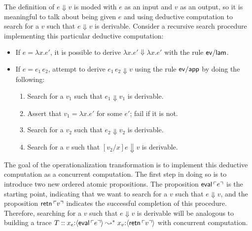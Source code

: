 The definition of $e \Downarrow v$ is moded with $e$ as an input and
$v$ as an output, so it is meaningful to talk about being given $e$
and using deductive computation to search for a $v$ such that $e
\Downarrow v$ is derivable.  Consider a recursive search procedure
implementing this particular deductive computation:
\begin{itemize}
\item
      If $e = \lambda x. e'$, 
      it is possible to derive 
      $\lambda x. e' \Downarrow \lambda x. e'$
      with the rule ${\sf ev/lam}$.
\item
       If $e = e_1\,e_2$,
       attempt to derive 
       $e_1\,e_2 \Downarrow v$
       using the rule ${\sf ev/app}$ by doing the following:
    \begin{enumerate}
    \item Search for a $v_1$ such that 
          $e_1 \Downarrow v_1$ is derivable.
    \item Assert that $v_1 = \lambda x.e'$ for some
          $e'$; fail if it is not.
    \item Search for a $v_2$ such that 
          $e_2 \Downarrow v_2$ is derivable.
    \item Search for a $v$ such that 
          $[v_2/x]e \Downarrow v$ is derivable.
    \end{enumerate}
\end{itemize}
%
The goal of the operationalization transformation is to implement this
deductive computation as a concurrent computation. The first step in
doing so is to introduce two new ordered atomic propositions.  The
proposition ${\sf eval}\,{\ulcorner{e}\urcorner}$ is the starting point, indicating
that we want to search for a $v$ such that $e \Downarrow v$, and the
proposition ${\sf retn}\,{\ulcorner{v}\urcorner}$ indicates the successful
completion of this procedure. Therefore, searching for a $v$ such that
$e \Downarrow v$ is derivable will be analogous to building a trace $T
:: x_e{:}\langle {{\sf eval}\,{\ulcorner{e}\urcorner}} \rangle \leadsto^* x_v{:}\langle {{\sf
    retn}\,{\ulcorner{v}\urcorner}} \rangle$ with concurrent computation.

